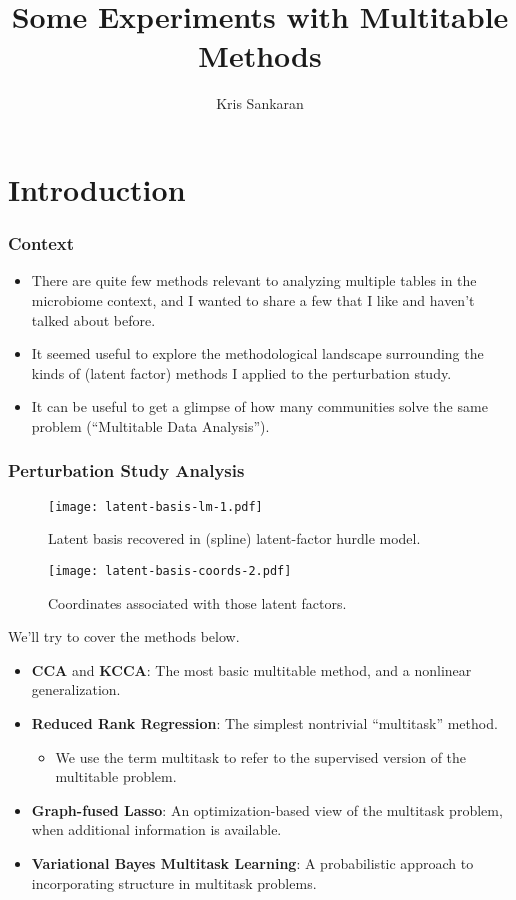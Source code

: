 \documentclass[10pt]{beamer}\usepackage[]{graphicx}\usepackage[]{color}
\title{Some Experiments with Multitable Methods}
\author{Kris Sankaran}
\begin{document}
\section{Introduction}

\begin{frame}
\maketitle
\end{frame}

\begin{frame}
  \frametitle{Context}
  \begin{itemize}
  \item There are quite few methods relevant to analyzing multiple tables in
    the microbiome context, and I wanted to share a few that I like and haven't
    talked about before.
  \item It seemed useful to explore the methodological landscape surrounding
    the kinds of (latent factor) methods I applied to the perturbation study.
  \item It can be useful to get a glimpse of how many communities solve the same
    problem (``Multitable Data Analysis'').
  \end{itemize}
\end{frame}
  
\begin{frame}
  \frametitle{Perturbation Study Analysis}
  \begin{figure}
    \texttt{[image: latent-basis-lm-1.pdf]}
    \caption{Latent basis recovered in (spline) latent-factor hurdle model.}
  \end{figure}
  \begin{figure}
    \texttt{[image: latent-basis-coords-2.pdf]}
    \caption{Coordinates associated with those latent factors.}
  \end{figure}
\end{frame}

\begin{frame}
  We'll try to cover the methods below.
  \begin{itemize}
  \item \textbf{CCA} and \textbf{KCCA}: The most basic multitable method, and
    a nonlinear generalization.
  \item \textbf{Reduced Rank Regression}: The simplest nontrivial ``multitask''
    method.
    \begin{itemize}
    \item We use the term multitask to refer to the supervised version of the
      multitable problem.
    \end{itemize}
  \item \textbf{Graph-fused Lasso}: An optimization-based view of the multitask
    problem, when additional information is available. 
\item \textbf{Variational Bayes Multitask Learning}: A probabilistic approach to 
  incorporating structure in multitask problems.
  \end{itemize}
\end{frame}
\end{document}
